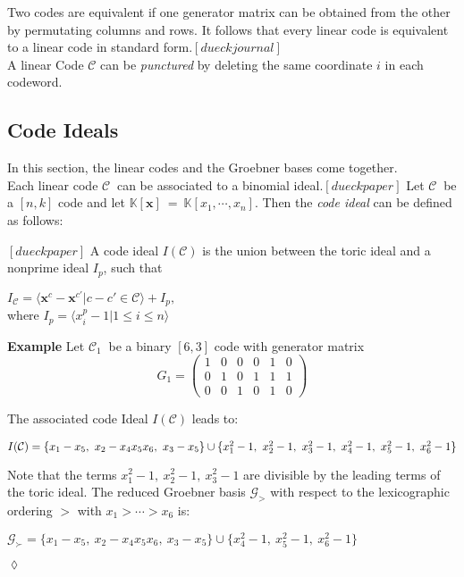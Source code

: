 Two codes are equivalent if one generator matrix can be obtained from the other by permutating columns and rows.
It follows that every linear code is equivalent to a linear code in standard form.$[dueckjournal]$ \\

A linear Code $\mathcal{C}$ can be \textit{punctured} by deleting the same coordinate $i$ in each codeword.


\subsection{Code Ideals}
\label{subsec:codeideals}
In this section, the linear codes and the Groebner bases come together.\\
Each linear code $\mathcal{C}~$ can be associated to a binomial ideal.$[dueckpaper]$ Let $\mathcal{C}~$ be a $[n,k]$ code and let 
$\mathbb{K}[\textbf{x}]~=~\mathbb{K}[x_{1},\cdots,x_{n}]$.
Then the \textit{code ideal} can be defined as follows:

\begin{env_definition}
$[dueckpaper]$ A code ideal $I(\mathcal{C})$ is the union between the toric ideal and a nonprime ideal $I_{p}$, such that
\begin{center}
$ I_{\mathcal{C}} = \langle \textbf{x}^{c} - \textbf{x}^{c'} | c - c' \in \mathcal{C}  \rangle + I_{p},$\\
\textrm{where}
 $I_{p} = \langle x_{i}^{p} - 1 | 1 \leq i \leq n \rangle $
\end{center}
\end{env_definition}


\textbf{Example} Let $\mathcal{C}_{1}~$ be a binary $[6,3]$ code with generator matrix
\[
G_{1} =
\begin{pmatrix}
1 & 0 & 0 & 0 & 1 & 0 \\ 
0 & 1 & 0 & 1 & 1 & 1 \\  
0 & 0 & 1 & 0 & 1 & 0  
\end{pmatrix} 
\]

The associated code Ideal $I(\mathcal{C})$ leads to: \newline
\begin{center}
$I(\mathcal{C}) = \{x_{1}-x_{5},~x_{2}-x_{4}x_{5}x_{6},~x_{3}-x_{5}  \} \cup \newline \{x_{1}^{2}-1,~x_{2}^{2}-1,~x_{3}^{2}-1,~x_{4}^{2}-1,~x_{5}^{2}-1,~x_{6}^{2}-1\}  $
\end{center}
Note that the terms $x_{1}^{2}-1,~x_{2}^{2}-1,~x_{3}^{2}-1 $ are divisible by the leading terms of the toric ideal.
The reduced Groebner basis $\mathcal{G}_{>}$ with respect to the lexicographic ordering $>$ with $x_{1} > \cdots > x_{6}$ is:
\begin{center}
$ \mathcal{G}_{\succ} = \{x_{1}-x_{5},~x_{2}-x_{4}x_{5}x_{6},~x_{3}-x_{5}  \} \cup \{x_{4}^{2}-1,~x_{5}^{2}-1,~x_{6}^{2}-1  \}  $
\end{center}

\begin{flushright}
$\lozenge$
\end{flushright} 

 

\newpage
